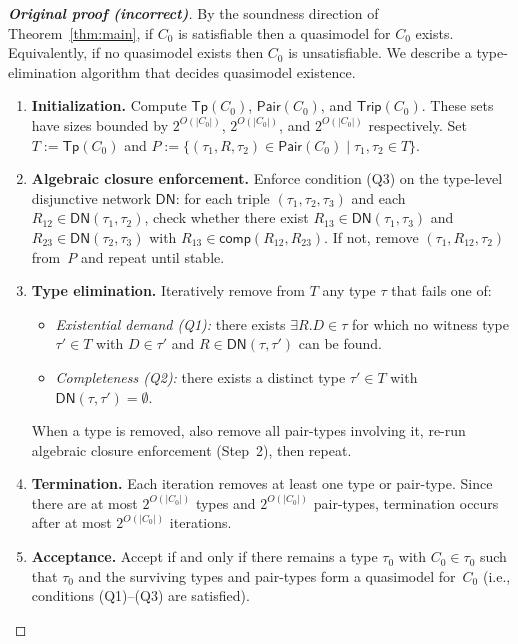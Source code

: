 \documentclass[a4paper,11pt]{article}
\theoremstyle{definition}
\newcommand{\comp}{\ensuremath{\mathsf{comp}}}
\newcommand{\Tp}{\ensuremath{\mathsf{Tp}}}
\newcommand{\Pair}{\ensuremath{\mathsf{Pair}}}
\newcommand{\Trip}{\ensuremath{\mathsf{Trip}}}
\begin{document}
\begin{proof}[\textbf{Original proof (incorrect)}]
By the soundness direction of Theorem~\ref{thm:main}, if $C_0$ is
satisfiable then a quasimodel for $C_0$ exists.  Equivalently, if no
quasimodel exists then $C_0$ is unsatisfiable.  We describe a
type-elimination algorithm that decides quasimodel existence.

\begin{enumerate}[nosep]
  \item \textbf{Initialization.}\; Compute $\Tp(C_0)$, $\Pair(C_0)$,
    and $\Trip(C_0)$.  These sets have sizes bounded by
    $2^{O(|C_0|)}$, $2^{O(|C_0|)}$, and $2^{O(|C_0|)}$ respectively.
    Set $T := \Tp(C_0)$ and $P := \{(\tau_1, R, \tau_2) \in \Pair(C_0)
    \mid \tau_1, \tau_2 \in T\}$.

  \item \textbf{Algebraic closure enforcement.}\; Enforce condition
    (Q3) on the type-level disjunctive network
    $\mathsf{DN}$: for each triple $(\tau_1, \tau_2, \tau_3)$ and each
    $R_{12} \in \mathsf{DN}(\tau_1, \tau_2)$, check whether there exist
    $R_{13} \in \mathsf{DN}(\tau_1, \tau_3)$ and $R_{23} \in
    \mathsf{DN}(\tau_2, \tau_3)$ with $R_{13} \in \comp(R_{12}, R_{23})$.
    If not, remove $(\tau_1, R_{12}, \tau_2)$ from~$P$ and repeat
    until stable.

  \item \textbf{Type elimination.}\; Iteratively remove from $T$ any
    type $\tau$ that fails one of:
    \begin{itemize}[nosep]
      \item \emph{Existential demand (Q1):} there exists $\exists R.D
        \in \tau$ for which no witness type $\tau' \in T$ with $D \in
        \tau'$ and $R \in \mathsf{DN}(\tau, \tau')$ can be found.
      \item \emph{Completeness (Q2):} there exists a distinct type
        $\tau' \in T$ with $\mathsf{DN}(\tau, \tau') = \emptyset$.
    \end{itemize}
    When a type is removed, also remove all pair-types involving it,
    re-run algebraic closure enforcement (Step~2), then repeat.

  \item \textbf{Termination.}\; Each iteration removes at least one
    type or pair-type.  Since there are at most $2^{O(|C_0|)}$ types
    and $2^{O(|C_0|)}$ pair-types, termination occurs after at most
    $2^{O(|C_0|)}$ iterations.

  \item \textbf{Acceptance.}\; Accept if and only if there remains a
    type $\tau_0$ with $C_0 \in \tau_0$ such that $\tau_0$ and the
    surviving types and pair-types form a quasimodel for~$C_0$
    (i.e., conditions (Q1)--(Q3) are satisfied).
\end{enumerate}


\end{proof}
\end{document}
